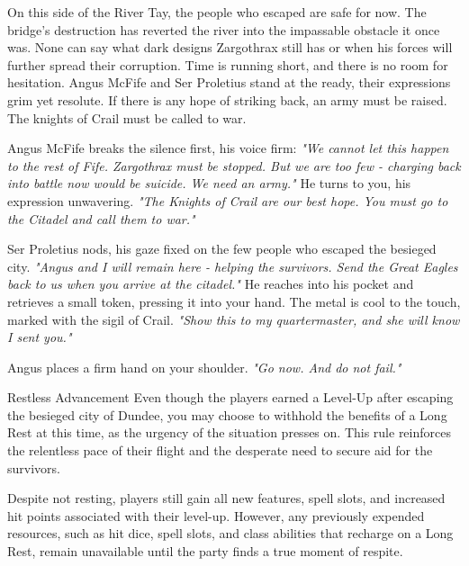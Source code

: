 	{}%
	{}%
	{}%
	{}%
	{}%
	{}%
	{}%
	{}%

	

{\entryfont On this side of the River Tay, the people who escaped are safe for now. The bridge's destruction has reverted the river into the impassable obstacle it once was. None can say what dark designs Zargothrax still has or when his forces will further spread their corruption. Time is running short, and there is no room for hesitation. Angus McFife and Ser Proletius stand at the ready, their expressions grim yet resolute. If there is any hope of striking back, an army must be raised. The knights of Crail must be called to war.}

\begin{DndReadAloud}
	Angus McFife breaks the silence first, his voice firm: \textit{"We cannot let this happen to the rest of Fife. Zargothrax must be stopped. But we are too few - charging back into battle now would be suicide. We need an army."} He turns to you, his expression unwavering. \textit{"The Knights of Crail are our best hope. You must go to the Citadel and call them to war."}

Ser Proletius nods, his gaze fixed on the few people who escaped the besieged city. \textit{"Angus and I will remain here - helping the survivors. Send the Great Eagles back to us when you arrive at the citadel."} He reaches into his pocket and retrieves a small token, pressing it into your hand. The metal is cool to the touch, marked with the sigil of Crail. \textit{"Show this to my quartermaster, and she will know I sent you."}

	Angus places a firm hand on your shoulder. \textit{"Go now. And do not fail."}
\end{DndReadAloud}

\begin{DndOptionalRule}{Restless Advancement}\label{or:RestlessAdvancement}%
	Even though the players earned a Level-Up after escaping the besieged city of Dundee, you may choose to withhold the benefits of a Long Rest at this time, as the urgency of the situation presses on. This rule reinforces the relentless pace of their flight and the desperate need to secure aid for the survivors.

	Despite not resting, players still gain all new features, spell slots, and increased hit points associated with their level-up. However, any previously expended resources, such as hit dice, spell slots, and class abilities that recharge on a Long Rest, remain unavailable until the party finds a true moment of respite.
\end{DndOptionalRule}

